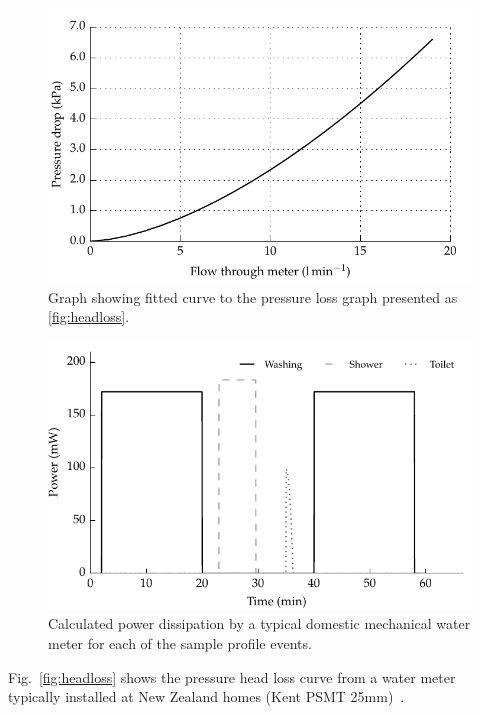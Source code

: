    \begin{figure}
        \centering
        \includegraphics[width=\linewidth]{content/pt1/02-WirelessWaterMeter/graphics/graph_pressureLoss}
        \caption{Graph showing fitted curve to the pressure loss graph presented as \cref{fig:headloss}.}
        \label{fig:headloss_fit}
    \end{figure}

    \begin{figure}
        \centering
        \includegraphics[width=\linewidth]{content/pt1/02-WirelessWaterMeter/graphics/graph_harvest}
        \caption{Calculated power dissipation by a typical domestic mechanical water meter for each of the sample profile events.}
        \label{fig:powerDissipated_meter}
    \end{figure}

    Fig.~\ref{fig:headloss} shows the pressure head loss curve from a water meter typically installed at New Zealand homes (Kent PSMT 25mm)~\cite{WatercareNewZealand2014}.

